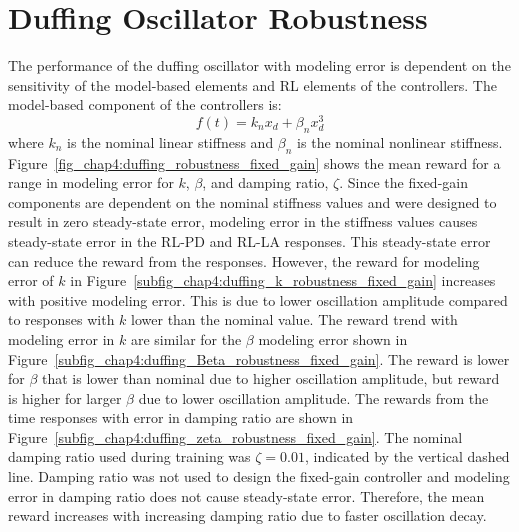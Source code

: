 \section{Duffing Oscillator Robustness}
%
The performance of the duffing oscillator with modeling error is dependent on the sensitivity of the model-based elements and RL elements of the controllers. The model-based component of the controllers is:
%
\begin{equation}
    f(t) = k_nx_d + \beta_n x_d^3
\end{equation}
%
where $k_n$ is the nominal linear stiffness and $\beta_n$ is the nominal nonlinear stiffness. 
Figure~\ref{fig_chap4:duffing_robustness_fixed_gain} shows the mean reward for a range in modeling error for $k$, $\beta$, and damping ratio, $\zeta$. Since the fixed-gain components are dependent on the nominal stiffness values and were designed to result in zero steady-state error, modeling error in the stiffness values causes steady-state error in the RL-PD and RL-LA responses.
This steady-state error can reduce the reward from the responses. However, the reward for modeling error of $k$ in Figure~\ref{subfig_chap4:duffing_k_robustness_fixed_gain} increases with positive modeling error. This is due to lower oscillation amplitude compared to responses with $k$ lower than the nominal value.
%
The reward trend with modeling error in $k$ are similar for the $\beta$ modeling error shown in Figure~\ref{subfig_chap4:duffing_Beta_robustness_fixed_gain}. The reward is lower for $\beta$ that is lower than nominal due to higher oscillation amplitude, but reward is higher for larger $\beta$ due to lower oscillation amplitude.
%
The rewards from the time responses with error in damping ratio are shown in Figure~\ref{subfig_chap4:duffing_zeta_robustness_fixed_gain}. The nominal damping ratio used during training was $\zeta=0.01$, indicated by the vertical dashed line. Damping ratio was not used to design the fixed-gain controller and modeling error in damping ratio does not cause steady-state error. Therefore, the mean reward increases with increasing damping ratio due to faster oscillation decay.
